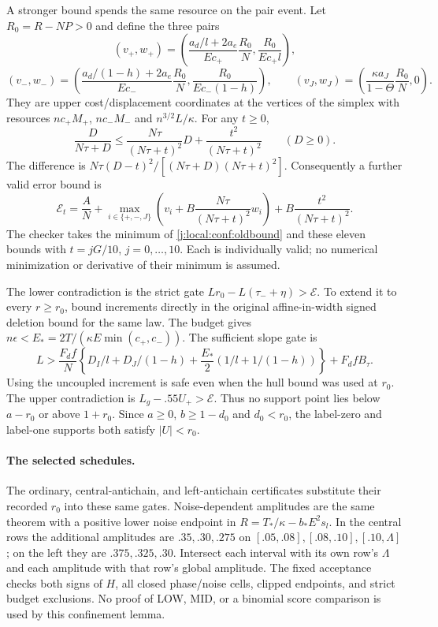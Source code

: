 A stronger bound spends the same resource on the pair event. Let
$R_0=R-NP>0$ and define the three pairs
\[
 (v_+,w_+)=\left(\frac{a_d/l+2a_e}{Ec_+}\frac{R_0}{N},
                    \frac{R_0}{Ec_+l}\right),
\]
\[
 (v_-,w_-)=\left(\frac{a_d/(1-h)+2a_e}{Ec_-}\frac{R_0}{N},
                    \frac{R_0}{Ec_-(1-h)}\right),\qquad
 (v_J,w_J)=\left(\frac{\kappa a_J}{1-\Theta}\frac{R_0}{N},0\right).
\]
They are upper cost/displacement coordinates at the vertices of the
simplex with resources $nc_+M_+$, $nc_-M_-$ and $n^{3/2}L/\kappa$.
For any $t\ge0$,
\[
 \frac{D}{N\tau+D}\le\frac{N\tau}{(N\tau+t)^2}D+
 \frac{t^2}{(N\tau+t)^2}\qquad(D\ge0).
\]
The difference is $N\tau(D-t)^2/[(N\tau+D)(N\tau+t)^2]$.
Consequently a further valid error bound is
\[
 \mathcal E_t=\frac AN+
 \max_{i\in\{+,-,J\}}\left(v_i+B\frac{N\tau}{(N\tau+t)^2}w_i\right)
 +B\frac{t^2}{(N\tau+t)^2}.
\]
The checker takes the minimum of \eqref{j:local:conf:oldbound} and these eleven
bounds with $t=jG/10$, $j=0,\ldots,10$. Each is individually valid;
no numerical minimization or derivative of their minimum is assumed.

The lower contradiction is the strict gate
$Lr_0-L(\tau_-+\eta)>\mathcal E$.
To extend it to every $r\ge r_0$, bound increments directly in the original
affine-in-width signed deletion bound for the same law. The budget gives
$n\epsilon<E_*=2T/(\kappa E\min(c_+,c_-))$. The sufficient slope gate is
\[
 L>\frac{F_df}{N}\left\{D_I/l+D_J/(1-h)
 +\frac{E_*}{2}\left(1/l+1/(1-h)\right)\right\}+F_dfB_\tau.
\]
Using the uncoupled increment is safe even when the hull bound was used
at $r_0$. The upper contradiction is $L_g-.55U_+>\mathcal E$.
Thus no support point lies below $a-r_0$ or above $1+r_0$.
Since $a\ge0$, $b\ge1-d_0$ and $d_0<r_0$, the label-zero and label-one
supports both satisfy $|U|<r_0$.


\paragraph{The selected schedules.}
The ordinary, central-antichain, and left-antichain certificates substitute
their recorded $r_0$ into these same gates. Noise-dependent amplitudes
are the same theorem with a positive lower noise endpoint in
$R=T_*/\kappa-b_*E^2s_l$. In the central rows the additional amplitudes
are $.35,.30,.275$ on $[.05,.08],[.08,.10],[.10,\Lambda]$;
on the left they are $.375,.325,.30$. Intersect each interval with its
own row's $\Lambda$ and each amplitude with that row's global amplitude.
The fixed acceptance checks both signs of $H$, all closed phase/noise
cells, clipped endpoints, and strict budget exclusions. No proof of
LOW, MID, or a binomial score comparison is used by this confinement lemma.




